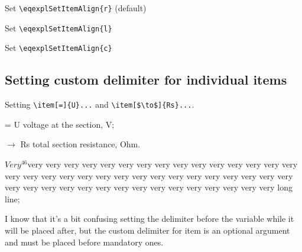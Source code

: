 \documentclass{article}
\begin{document}
\noindent Set \verb+\eqexplSetItemAlign{r}+ (default)

\begin{eqexpl}
  \testList
\end{eqexpl}

\vspace{5mm}

\noindent Set \verb+\eqexplSetItemAlign{l}+

\begin{eqexpl}
  \testList
\end{eqexpl}

\vspace{5mm}

\noindent Set \verb+\eqexplSetItemAlign{c}+

\begin{eqexpl}
  \testList
\end{eqexpl}


\subsection{Setting custom delimiter for individual items}

\noindent Setting \verb+\item[=]{U}...+ and
\verb+\item[$\to$]{Rs}...+.

\begin{eqexpl}
  \item[=]{U} voltage at the section, V;
  \item[$\to$]{Rs} total section resistance, Ohm.
  \item{$Very^{46}$}very very very very very very very very very very very
    very very very very very very very very very very very very very
    very very very very very very very very very very very very very
    very very very very very very very very very long line;
\end{eqexpl}

I know that it's a bit confusing setting the delimiter before the
variable while it will be placed after, but the custom delimiter for
item is an optional argument and must be placed before mandatory ones.
\end{document}
